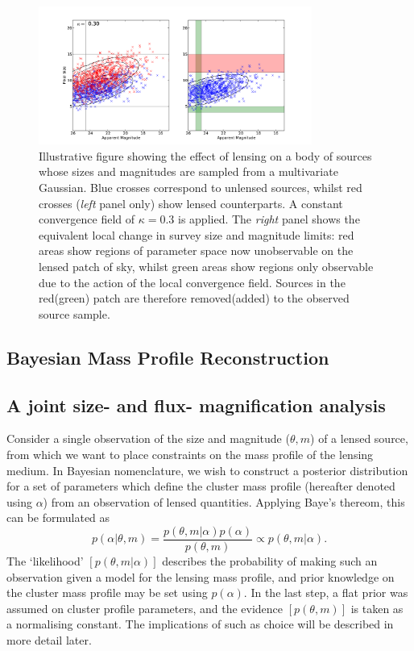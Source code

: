 \documentclass[useAMS,usenatbib,times,letter,amssymb]{mn2e}
\def\be{\begin{equation}}
\def\ee{\end{equation}}
\begin{document}
\begin{figure}
\centering
\includegraphics[width = 0.8\textwidth]{Figures/Size_Magnitude_Lensing_Diagram.pdf}
\caption{Illustrative figure showing the effect of lensing on a body of sources whose sizes and magnitudes are sampled from a multivariate Gaussian. Blue crosses correspond to unlensed sources, whilst red crosses ({\it left} panel only) show lensed counterparts. A constant convergence field of $\kappa = 0.3$ is applied. The {\it right} panel shows the equivalent local change in survey size and magnitude limits: red areas show regions of parameter space now unobservable on the lensed patch of sky, whilst green areas show regions only observable due to the action of the local convergence field. Sources in the red(green) patch are therefore removed(added) to the observed source sample.}\label{fig:Size_Mag_Lensing_Example}
\end{figure}

\subsection{Bayesian Mass Profile Reconstruction}\label{sec:Reconstruction_Method}


\subsection{A joint size- and flux- magnification analysis}

Consider a single observation of the size and magnitude ($\theta, m$) of a lensed source, from which we want to place constraints on the mass profile of the lensing medium. In Bayesian nomenclature, we wish to construct a posterior distribution for a set of parameters which define the cluster mass profile (hereafter denoted using $\alpha$) from an observation of lensed quantities. Applying Baye's thereom, this can be formulated as
\be\label{eqn:BayesTheorem}
p(\alpha|\theta, m) = \frac{p(\theta, m|\alpha)p(\alpha)}{p(\theta,m)} \propto p(\theta,m|\alpha).
\ee
The `likelihood' $[p(\theta, m|\alpha)]$ describes the probability of making such an observation given a model for the lensing mass profile, and prior knowledge on the cluster mass profile may be set using $p(\alpha)$. In the last step, a flat prior was assumed on cluster profile parameters, and the evidence $[p(\theta,m)]$ is taken as a normalising constant. The implications of such as choice will be described in more detail later.
\end{document}
